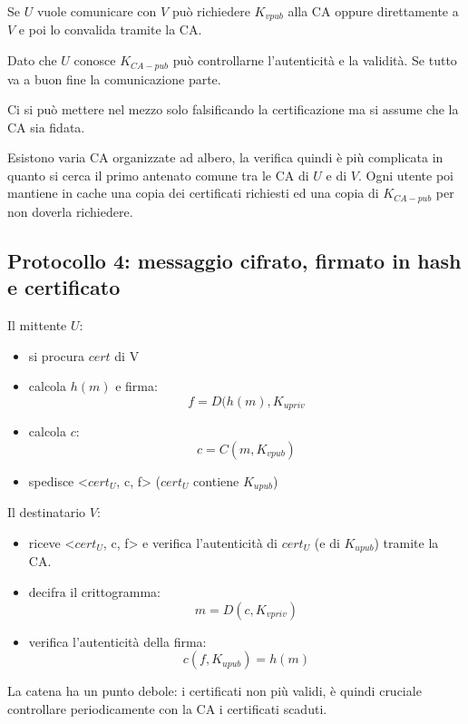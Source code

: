 Se $U$ vuole comunicare con $V$ può richiedere $K_{vpub}$ alla CA oppure direttamente a $V$ e poi lo convalida tramite la CA.

Dato che $U$ conosce $K_{CA-pub}$ può controllarne l'autenticità e la validità.
Se tutto va a buon fine la comunicazione parte.

Ci si può mettere nel mezzo solo falsificando la certificazione ma si assume che la CA sia fidata.

Esistono varia CA organizzate ad albero, la verifica quindi è più complicata in quanto si cerca il primo antenato comune tra le CA di $U$ e di $V$. Ogni utente poi mantiene in cache una copia dei certificati richiesti ed una copia di $K_{CA-pub}$ per non doverla richiedere.

\subsection{Protocollo 4: messaggio cifrato, firmato in hash e certificato}
Il mittente $U$:
\begin{itemize}
    \item si procura $cert$ di V

    \item calcola $h(m)$ e firma:
    $$ f = D(h(m),K_{upriv} $$

    \item calcola $c$:
    $$ c = C(m, K_{vpub}) $$

    \item spedisce <$cert_U$, c, f> ($cert_U$ contiene $K_{upub}$)
\end{itemize}

Il destinatario $V$:
\begin{itemize}
    \item riceve <$cert_U$, c, f> e verifica l'autenticità di $cert_U$ (e di $K_{upub}$) tramite la CA.

    \item decifra il crittogramma:
    $$ m=D(c, K_{vpriv}) $$

    \item verifica l'autenticità della firma:
    $$ c(f, K_{upub}) = h(m) $$
\end{itemize}

La catena ha un punto debole: i certificati non più validi, è quindi cruciale controllare periodicamente con la CA i certificati scaduti.